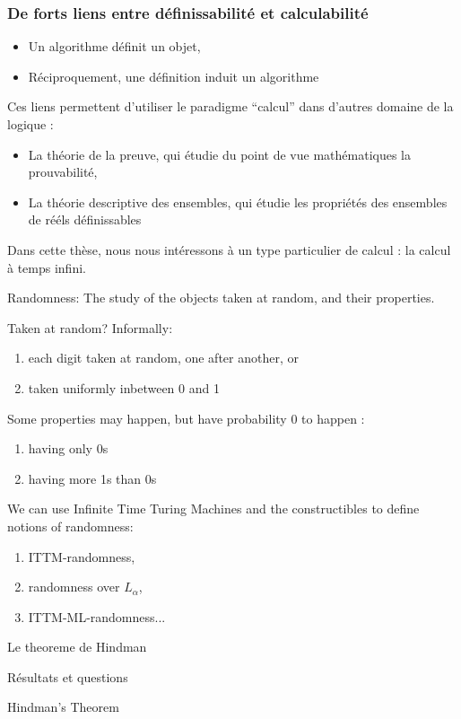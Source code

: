 \documentclass[ignorenonframetext]{beamer}
\begin{document}
\begin{frame}
  \frametitle{De forts liens entre définissabilité et calculabilité}
  \begin{itemize}
  \item Un algorithme définit un objet,
  \item Réciproquement, une définition induit un algorithme
  \end{itemize}
  Ces liens permettent d'utiliser le paradigme ``calcul'' dans d'autres domaine de la logique :
  \begin{itemize}
  \item La théorie de la preuve, qui étudie du point de vue mathématiques la prouvabilité,
  \item La théorie descriptive des ensembles, qui étudie les propriétés des ensembles de rééls définissables
  \end{itemize}
\end{frame}
\begin{frame}
  Dans cette thèse, nous nous intéressons à un type particulier de calcul : la calcul à temps infini.
\end{frame}
\begin{frame}
  Randomness:
  The study of the objects taken at random, and their properties.

  Taken at random? Informally:
  \begin{enumerate}
  \item each digit taken at random, one after another, or
  \item taken uniformly inbetween 0 and 1
  \end{enumerate}
  Some properties may happen, but have probability 0 to happen :
  \begin{enumerate}
  \item having only 0s
  \item having more 1s than 0s
  \end{enumerate}
\end{frame}
\begin{frame}
  We can use Infinite Time Turing Machines and the constructibles to define notions of randomness:
  \begin{definition}
    \begin{enumerate}
    \item ITTM-randomness,
    \item randomness over $L_\alpha$,
    \item ITTM-ML-randomness...
    \end{enumerate}
  \end{definition}
  \begin{theorem}
    Le theoreme de Hindman
  \end{theorem}
\end{frame}
\begin{frame}
  Résultats et questions
\end{frame}
\begin{fame}
Hindman's Theorem  
\end{fame}
\end{document}
